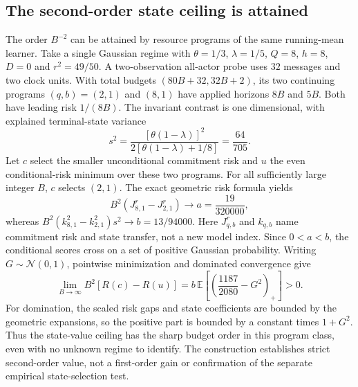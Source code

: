 \subsection{The second-order state ceiling is attained}
The order $B^{-2}$ can be attained by resource programs of the same running-mean learner.
Take a single Gaussian regime with $\theta=1/3$, $\lambda=1/5$, $Q=8$, $h=8$, $D=0$ and $r^2=49/50$.
A two-observation all-actor probe uses $32$ messages and two clock units.
With total budgets $(80B+32,32B+2)$, its two continuing programs $(q,b)=(2,1)$ and $(8,1)$ have applied horizons $8B$ and $5B$.
Both have leading risk $1/(8B)$.
The invariant contrast is one dimensional, with explained terminal-state variance
\[
s^2=\frac{[\theta(1-\lambda)]^2}{2[\theta(1-\lambda)+1/8]}=\frac{64}{705}.
\]
Let $c$ select the smaller unconditional commitment risk and $u$ the even conditional-risk minimum over these two programs.
For all sufficiently large integer $B$, $c$ selects $(2,1)$.
The exact geometric risk formula yields
\[
B^2(J_{8,1}^{r}-J_{2,1}^{r})\longrightarrow a=\frac{19}{320000},
\]
whereas $B^2(k_{8,1}^2-k_{2,1}^2)s^2\longrightarrow b=13/94000$.
Here $J_{q,b}^{r}$ and $k_{q,b}$ name commitment risk and state transfer, not a new model index.
Since $0<a<b$, the conditional scores cross on a set of positive Gaussian probability.
Writing $G\sim\mathcal N(0,1)$, pointwise minimization and dominated convergence give
\[
\lim_{B\to\infty}B^2[R(c)-R(u)]
=b\,\mathbb E\left[\left(\frac{1187}{2080}-G^2\right)_+\right]>0.
\]
For domination, the scaled risk gaps and state coefficients are bounded by the geometric expansions, so the positive part is bounded by a constant times $1+G^2$.
Thus the state-value ceiling has the sharp budget order in this program class, even with no unknown regime to identify.
The construction establishes strict second-order value, not a first-order gain or confirmation of the separate empirical state-selection test.
